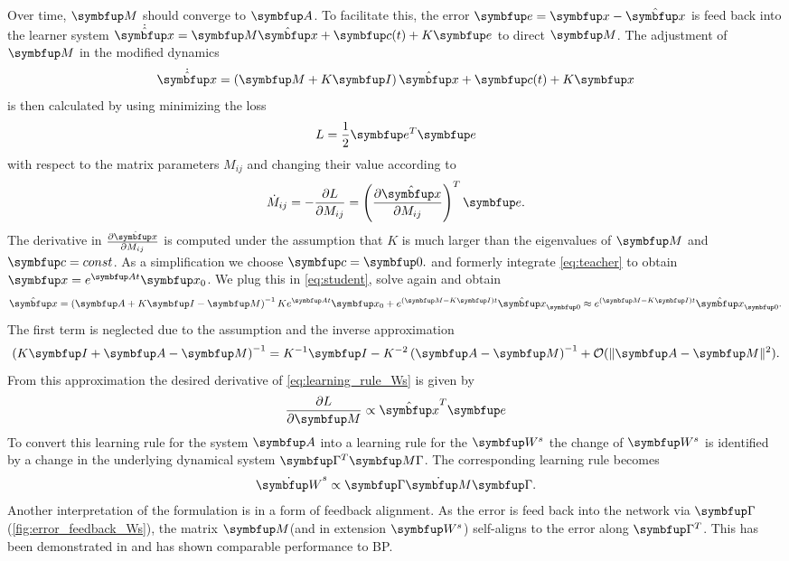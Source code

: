 Over time, $\bmu{M}$ should converge to $\bmu{A}$. To facilitate this, the error $\bmu{e} = \bmu{x} - \hat{\bmu{x}}$ is feed back into the learner system $\dot{\hat{\bmu{x}}} =\bmu{M}\hat{\bmu{x}} + \bmu{c}(t)  + K\bmu{e}$ to direct $\bmu{M}$.
The adjustment of $\bmu{M}$ in the modified dynamics
\begin{equation}\label{eq:student}
	\dot{\hat{\bmu{x}}} = \left(\bmu{M} + K\bmu{I}\right)\hat{\bmu{x}} + \bmu{c}(t) + K\bmu{x}
\end{equation}
is then calculated by using minimizing the loss
\begin{equation}
	L = \frac{1}{2}\bmu{e}^T\bmu{e}
\end{equation}
with respect to the matrix parameters $M_{ij}$ and changing their value according to
\begin{equation}\label{eq:learning_rule_Ws}
	\dot{M}_{ij} = -\frac{\partial L}{\partial M_{ij}} = \left(\frac{\partial \hat{\bmu{x}}}{\partial M_{ij}}\right)^T\bmu{e}.
\end{equation}
The derivative in $\frac{\partial \hat{\bmu{x}}}{\partial M_{ij}}$ is computed under the assumption that $K$ is much larger than the eigenvalues of $\bmu{M}$ and $\bmu{c} = const$. As a simplification we choose $\bmu{c} = \bmu{0}.$ and formerly integrate \cref{eq:teacher} to obtain $\bmu{x} = e^{\bmu{A}t}\bmu{x_0}$. We plug this in \cref{eq:student}, solve again and obtain
\begin{equation}\label{eq:hat_x_derivative}
	\hat{\bmu{x}} = \left(\bmu{A} + K\bmu{I} - \bmu{M}\right)^{-1}K e^{\bmu{A}t}\bmu{x_0} + e^{\left(\bmu{M}- K\bmu{I}\right)t}\hat{\bmu{x}}_{\bmu{0}}  \approx e^{\left(\bmu{M}- K\bmu{I}\right)t}\hat{\bmu{x}}_{\bmu{0}}.
\end{equation}
The first term is neglected due to the assumption and the inverse approximation
\begin{equation}
	\left(K\bmu{I} + \bmu{A} - \bmu{M}\right)^{-1}  = K^{-1}\bmu{I} - K^{-2}\left(\bmu{A} - \bmu{M}\right)^{-1} + \mathcal{O}(\|\bmu{A - \bmu{M}}\|^2).
\end{equation}
From this approximation the desired derivative of \cref{eq:learning_rule_Ws} is given by
\begin{equation}
	\frac{\partial L}{\partial \bmu{M}}\propto \hat{\bmu{x}}^T\bmu{e}
\end{equation}
To convert this learning rule for the system $\bmu{A}$ into a learning rule for the $\bmu{W}^s$ the change of $\bmu{W}^s$ is identified by a change in the underlying dynamical system $\bmu{\Gamma}^T \bmu{M \Gamma}$. The corresponding learning rule becomes
\begin{equation}
	\dot{\bmu{W}}^s \propto \bmu{\Gamma}\dot{\bmu{M}}\bmu{\Gamma}.
\end{equation}
Another interpretation of the formulation is in a form of feedback alignment. As the error is feed back into the network via $\bmu{\Gamma}$ (\cref{fig:error_feedback_Ws}), the matrix $\bmu{M}$(and in extension $\bmu{W}^s$) self-aligns to the error along $\bmu{\Gamma}^T$.
This has been demonstrated in \cite{lillicrap_random_2016} and has shown comparable performance to \ac{BP}.